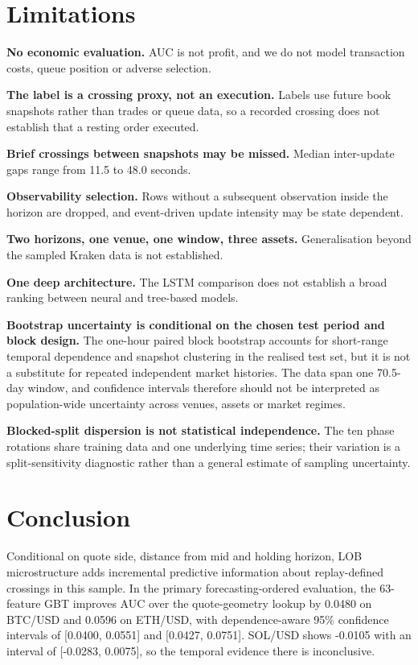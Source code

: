 \documentclass[11pt]{article}
\begin{document}
\section{Limitations}

\textbf{No economic evaluation.} AUC is not profit, and we do not model
transaction costs, queue position or adverse selection.

\textbf{The label is a crossing proxy, not an execution.} Labels use future book
snapshots rather than trades or queue data, so a recorded crossing does not
establish that a resting order executed.

\textbf{Brief crossings between snapshots may be missed.} Median inter-update
gaps range from 11.5 to 48.0 seconds.

\textbf{Observability selection.} Rows without a subsequent observation inside
the horizon are dropped, and event-driven update intensity may be state
dependent.

\textbf{Two horizons, one venue, one window, three assets.} Generalisation
beyond the sampled Kraken data is not established.

\textbf{One deep architecture.} The LSTM comparison does not establish a broad
ranking between neural and tree-based models.

\textbf{Bootstrap uncertainty is conditional on the chosen test period and
block design.} The one-hour paired block bootstrap accounts for short-range
temporal dependence and snapshot clustering in the realised test set, but it is
not a substitute for repeated independent market histories. The data span one
70.5-day window, and confidence intervals therefore should not be interpreted
as population-wide uncertainty across venues, assets or market regimes.

\textbf{Blocked-split dispersion is not statistical independence.} The ten
phase rotations share training data and one underlying time series; their
variation is a split-sensitivity diagnostic rather than a general estimate of
sampling uncertainty.

\section{Conclusion}

Conditional on quote side, distance from mid and holding horizon, LOB
microstructure adds incremental predictive information about replay-defined
crossings in this sample. In the primary forecasting-ordered evaluation, the
63-feature GBT improves AUC over the quote-geometry lookup by 0.0480 on BTC/USD
and 0.0596 on ETH/USD, with dependence-aware 95\% confidence intervals of
[0.0400, 0.0551] and [0.0427, 0.0751]. SOL/USD shows -0.0105 with an interval of
[-0.0283, 0.0075], so the temporal evidence there is inconclusive.
\end{document}
